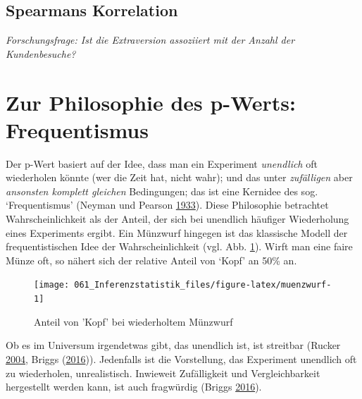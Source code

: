 \documentclass[12pt,ngerman,]{book}
\makeatletter
\newenvironment{Shaded}{\begin{snugshade}}{\end{snugshade}}
\newcommand{\KeywordTok}[1]{\textcolor[rgb]{0.13,0.29,0.53}{\textbf{#1}}}
\newcommand{\DataTypeTok}[1]{\textcolor[rgb]{0.13,0.29,0.53}{#1}}
\newcommand{\StringTok}[1]{\textcolor[rgb]{0.31,0.60,0.02}{#1}}
\newcommand{\OperatorTok}[1]{\textcolor[rgb]{0.81,0.36,0.00}{\textbf{#1}}}
\newcommand{\NormalTok}[1]{#1}
\newenvironment{kframe}{%
\medskip{}
\setlength{\fboxsep}{.8em}
 \def\at@end@of@kframe{}%
 \ifinner\ifhmode%
  \def\at@end@of@kframe{\end{minipage}}%
  \begin{minipage}{\columnwidth}%
 \fi\fi%
 \def\FrameCommand##1{\hskip\@totalleftmargin \hskip-\fboxsep
 \colorbox{shadecolor}{##1}\hskip-\fboxsep
     \hskip-\linewidth \hskip-\@totalleftmargin \hskip\columnwidth}%
 \MakeFramed {\advance\hsize-\width
   \@totalleftmargin\z@ \linewidth\hsize
   \@setminipage}}%
 {\par\unskip\endMakeFramed%
 \at@end@of@kframe}
\renewenvironment{Shaded}{\begin{kframe}}{\end{kframe}}
\theoremstyle{definition}
\theoremstyle{definition}
\theoremstyle{remark}
\makeatother
\begin{document}
\subsection{Spearmans Korrelation}\label{spearmans-korrelation}

\emph{Forschungsfrage: Ist die Extraversion assoziiert mit der Anzahl
der Kundenbesuche?}

\begin{Shaded}
\end{Shaded}

\section{Zur Philosophie des p-Werts:
Frequentismus}\label{zur-philosophie-des-p-werts-frequentismus}

Der p-Wert basiert auf der Idee, dass man ein Experiment
\emph{unendlich} oft wiederholen könnte (wer die Zeit hat, nicht wahr);
und das unter \emph{zufälligen} aber \emph{ansonsten komplett gleichen}
Bedingungen; das ist eine Kernidee des sog. `Frequentismus' (Neyman und
Pearson \protect\hyperlink{ref-Neyman1933}{1933}). Diese Philosophie
betrachtet Wahrscheinlichkeit als der Anteil, der sich bei unendlich
häufiger Wiederholung eines Experiments ergibt. Ein Münzwurf hingegen
ist das klassische Modell der frequentistischen Idee der
Wahrscheinlichkeit (vgl. Abb. \ref{fig:muenzwurf}). Wirft man eine faire
Münze oft, so nähert sich der relative Anteil von `Kopf' an 50\% an.

\begin{figure}

{\centering \texttt{[image: 061\_Inferenzstatistik\_files/figure-latex/muenzwurf-1]} 

}

\caption{Anteil von 'Kopf' bei wiederholtem Münzwurf}\label{fig:muenzwurf}
\end{figure}

Ob es im Universum irgendetwas gibt, das unendlich ist, ist streitbar
(Rucker \protect\hyperlink{ref-ruckerinfinity}{2004}, Briggs
(\protect\hyperlink{ref-uncertainty}{2016})). Jedenfalls ist die
Vorstellung, das Experiment unendlich oft zu wiederholen, unrealistisch.
Inwieweit Zufälligkeit und Vergleichbarkeit hergestellt werden kann, ist
auch fragwürdig (Briggs \protect\hyperlink{ref-uncertainty}{2016}).
\end{document}
